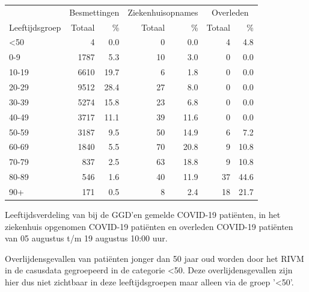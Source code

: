 \documentclass[
  english,
  man,floatsintext]{apa6}
\begin{document}
\begin{table}
\centering\begingroup\fontsize{11}{13}\selectfont

\begin{threeparttable}
\begin{tabular}{lrrrrrr}
\toprule
\multicolumn{1}{c}{ } & \multicolumn{2}{c}{Besmettingen} & \multicolumn{2}{c}{Ziekenhuisopnames} & \multicolumn{2}{c}{Overleden} \\
\cmidrule(l{3pt}r{3pt}){2-3} \cmidrule(l{3pt}r{3pt}){4-5} \cmidrule(l{3pt}r{3pt}){6-7}
Leeftijdsgroep & Totaal & \% & Totaal & \% & Totaal & \%\\
\midrule
<50 & 4 & 0.0 & 0 & 0.0 & 4 & 4.8\\
0-9 & 1787 & 5.3 & 10 & 3.0 & 0 & 0.0\\
10-19 & 6610 & 19.7 & 6 & 1.8 & 0 & 0.0\\
20-29 & 9512 & 28.4 & 27 & 8.0 & 0 & 0.0\\
30-39 & 5274 & 15.8 & 23 & 6.8 & 0 & 0.0\\
40-49 & 3717 & 11.1 & 39 & 11.6 & 0 & 0.0\\
50-59 & 3187 & 9.5 & 50 & 14.9 & 6 & 7.2\\
60-69 & 1840 & 5.5 & 70 & 20.8 & 9 & 10.8\\
70-79 & 837 & 2.5 & 63 & 18.8 & 9 & 10.8\\
80-89 & 546 & 1.6 & 40 & 11.9 & 37 & 44.6\\
90+ & 171 & 0.5 & 8 & 2.4 & 18 & 21.7\\
\bottomrule
\end{tabular}
\begin{tablenotes}
\item[1] Leeftijdsverdeling van bij de GGD’en gemelde COVID-19 patiënten, in het ziekenhuis opgenomen COVID-19 patiënten en overleden COVID-19 patiënten van 05 augustus t/m 19 augustus 10:00 uur.
\item[2] Overlijdensgevallen van patiënten jonger dan 50 jaar oud worden door het RIVM in de casusdata gegroepeerd in de categorie <50. Deze overlijdensgevallen zijn hier dus niet zichtbaar in deze leeftijdsgroepen maar alleen via de groep '<50'.
\end{tablenotes}
\end{threeparttable}
\endgroup{}
\end{table}

\newpage
\end{document}
